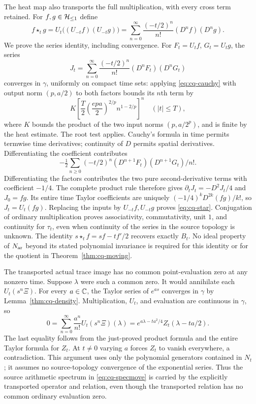 The heat map also transports the full multiplication, with every
cross term retained. For $f,g\in\mathcal H_{\leq 1}$ define
\begin{equation}\label{eq:cq-star}
 f\star_t g=U_t\bigl((U_{-t}f)(U_{-t}g)\bigr)
    =\sum_{n=0}^\infty\frac{(-t/2)^n}{n!}(D^nf)(D^ng).
\end{equation}
We prove the series identity, including convergence. For
$F_t=U_tf$, $G_t=U_tg$, the series
\[
 J_t=\sum_{n=0}^\infty\frac{(-t/2)^n}{n!}
                    (D^nF_t)(D^nG_t)
\]
converges in $\gamma$, uniformly on compact time sets: applying
\eqref{eq:cq-cauchy} with output norm $(p,a/2)$ to both factors
bounds its $n$th term by
\[
 K\left[\frac T2\left(\frac{epa}{2}\right)^{2/p}
                   n^{1-2/p}\right]^n\quad(|t|\leq T),
\]
where $K$ bounds the product of the two input norms
$(p,a/2^p)$, and is finite by the heat estimate. The root test
applies. Cauchy's formula in time permits termwise time derivatives;
continuity of $D$ permits spatial derivatives. Differentiating the
coefficient contributes
\[
 -\tfrac12\sum_{n\ge0}(-t/2)^n(D^{n+1}F_t)(D^{n+1}G_t)/n!.
\]
Differentiating the factors contributes the two pure second-derivative
terms with coefficient $-1/4$. The complete product rule therefore
gives $\partial_tJ_t=-D^2J_t/4$ and $J_0=fg$.
Its entire time Taylor coefficients are uniquely
$(-1/4)^kD^{2k}(fg)/k!$, so $J_t=U_t(fg)$.
Replacing the inputs by $U_{-t}f,U_{-t}g$ proves
\eqref{eq:cq-star}. Conjugation of ordinary multiplication proves
associativity, commutativity, unit $1$, and continuity for $\tau_t$,
even when continuity of the series in the source topology is unknown.
The identity $s\star_t f=sf-tf'/2$ recovers exactly $B_t$.
No ideal property of $N_{\rm ar}$ beyond its stated polynomial invariance
is required for this identity or for the quotient in
Theorem~\ref{thm:cq-moving}.

The transported actual trace image has no common point-evaluation
zero at any nonzero time. Suppose $\lambda$ were such a common
zero. It would annihilate each $U_t(s^n\Xi)$. For every $a\in\mathbb C$,
the Taylor series of $e^{as}$ converges in $\gamma$ by
Lemma~\ref{thm:cq-density}. Multiplication, $U_t$, and evaluation
are continuous in $\gamma$, so
\[
 0=\sum_{n=0}^\infty\frac{a^n}{n!}U_t(s^n\Xi)(\lambda)
   =e^{a\lambda-ta^2/4}Z_t(\lambda-ta/2).
\]
The last equality follows from the just-proved product formula
and the entire Taylor formula for $Z_t$. At $t\ne0$ varying $a$
forces $Z_t$ to vanish everywhere, a contradiction. This argument
uses only the polynomial generators contained in $N_t$; it assumes
no source-topology convergence of the exponential series. Thus the
source arithmetic spectrum in \eqref{eq:cq-specmove} is carried by
the explicitly transported operator and relation, even though the
transported relation has no common ordinary evaluation zero.

